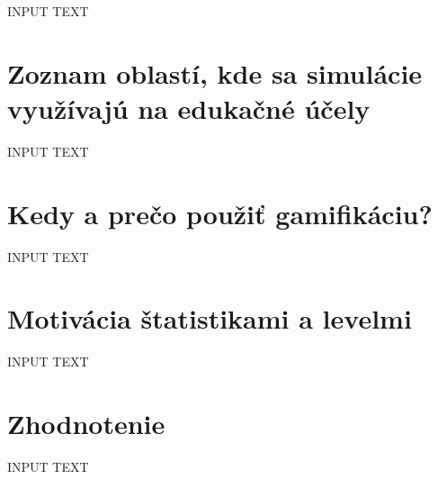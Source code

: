 \documentclass[10pt,slovak,a4paper]{article}
\begin{document}
INPUT TEXT

\section{Zoznam oblastí, kde sa simulácie využívajú na edukačné účely} \label{List}

INPUT TEXT

\section{Kedy a prečo použiť gamifikáciu?} \label{List}

INPUT TEXT

\section{Motivácia štatistikami a levelmi} \label{Motivation}

INPUT TEXT

\section{Zhodnotenie} \label{Evaluation}

INPUT TEXT

%
%
\end{document}
